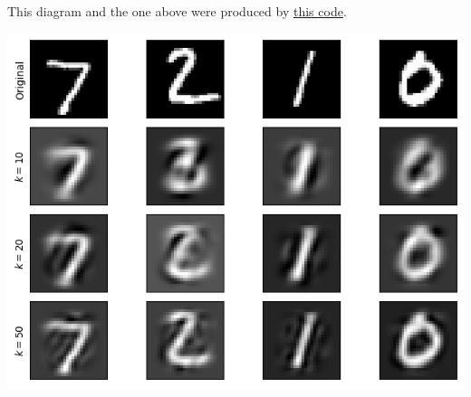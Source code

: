 \documentclass{../../../kin_math}
\begin{document}
\begin{questions}
\begin{enumerate}
    \begin{solution}
      This diagram and the one above were produced by \href{https://github.com/elijahkin/school/blob/main/umd/amsc660/hw3.ipynb}{this code}.
      \begin{center}
        \includegraphics[scale=0.7]{mnist2.png}
      \end{center}
    \end{solution}
  \end{enumerate}
\end{questions}
\end{document}
